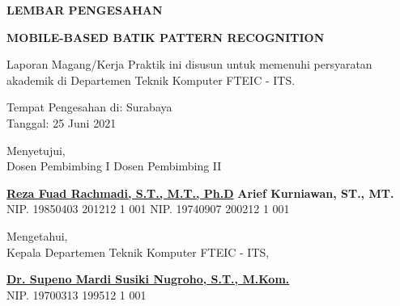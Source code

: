 \begin{center}
  {\Large \textbf{LEMBAR PENGESAHAN}}
  \vspace{6ex}


  {\large \textbf{MOBILE-BASED BATIK PATTERN RECOGNITION}}
  \vspace{6ex}

  Laporan Magang/Kerja Praktik ini disusun untuk memenuhi persyaratan akademik di Departemen Teknik Komputer FTEIC - ITS.
  \vspace{2ex}

  Tempat Pengesahan di: Surabaya \\
  Tanggal: 25 Juni 2021
  \vspace{8ex}

  Menyetujui, \\
  Dosen Pembimbing I \tab Dosen Pembimbing II
  \vspace{12ex}

  \textbf{\underline{Reza Fuad Rachmadi, S.T., M.T., Ph.D}} \tab \textbf{Arief Kurniawan, ST., MT.} \\
  NIP. 19850403 201212 1 001 \tab NIP. 19740907 200212 1 001
  \vspace{8ex}

  Mengetahui, \\
  Kepala Departemen Teknik Komputer FTEIC - ITS,
  \vspace{12ex}

  \textbf{\underline{Dr. Supeno Mardi Susiki Nugroho, S.T., M.Kom.}} \\
  NIP. 19700313 199512 1 001

\end{center}